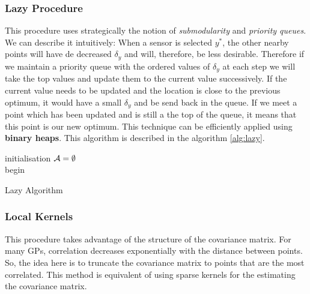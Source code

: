 \subsubsection{Lazy Procedure} This procedure uses strategically the notion of \textit{submodularity} and \textit{priority queues}. We can describe it intuitively: When a sensor is selected $y^*$, the other nearby points will have de decreased $\delta_y$ and will, therefore, be less desirable. Therefore if we maintain a priority queue with the ordered values of $\delta_y$ at each step we will take the top values and update them to the current value successively. If the current value needs to be updated and the location is close to the previous optimum, it would have a small $\delta_y$ and be send back in the queue. If we meet a point which has been updated and is still a the top of the queue, it means that this point is our new optimum. This technique can be efficiently applied using \textbf{binary heaps}. This algorithm is described in the algorithm \ref{alg:lazy}. \\ 


\begin{algorithm}[h]
 initialisation\;
 $\mathcal{A} = \emptyset$ \\
 begin\;
\caption{Lazy Algorithm}
\label{alg:lazy}
\end{algorithm}

\subsubsection{Local Kernels} This procedure takes advantage of the structure of the covariance matrix. For many GPs, correlation decreases exponentially with the distance between points. So, the idea here is to truncate the covariance matrix to points that are the most correlated. This method is equivalent of using sparse kernels for the estimating the covariance matrix. \\ 

